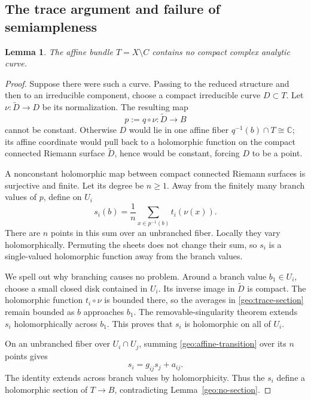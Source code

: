 \documentclass[11pt,a4paper]{article}
\numberwithin{equation}{section}
\newtheorem{lemma}[theorem]{Lemma}
\theoremstyle{definition}
\theoremstyle{remark}
\newcommand{\C}{\mathbb C}
\begin{document}
\subsection{The trace argument and failure of semiampleness}

\begin{lemma}\label{geo:no-compact-curves}
The affine bundle $T=X\setminus C$ contains no compact complex
analytic curve.
\end{lemma}

\begin{proof}
Suppose there were such a curve.  Passing to the reduced structure
and then to an irreducible component, choose a compact irreducible
curve $D\subset T$.  Let $\nu:\widetilde D\to D$ be its
normalization.  The resulting map
\[
  p:=q\circ\nu:\widetilde D\longrightarrow B
\]
cannot be constant.  Otherwise $D$ would lie in one affine fiber
$q^{-1}(b)\cap T\cong\C$; its affine coordinate would pull back to
a holomorphic function on the compact connected Riemann surface
$\widetilde D$, hence would be constant, forcing $D$ to be a point.

A nonconstant holomorphic map between compact connected Riemann
surfaces is surjective and finite.  Let its degree be $n\geq1$.
Away from the finitely many branch values of $p$, define on $U_i$
\begin{equation}\label{geo:trace-section}
  s_i(b)=\frac{1}{n}
          \sum_{x\in p^{-1}(b)}t_i(\nu(x)).
\end{equation}
There are $n$ points in this sum over an unbranched fiber.  Locally
they vary holomorphically.  Permuting the sheets does not change
their sum, so $s_i$ is a single-valued holomorphic function away
from the branch values.

We spell out why branching causes no problem.  Around a branch
value $b_1\in U_i$, choose a small closed disk contained in $U_i$.
Its inverse image in $\widetilde D$ is compact.  The holomorphic
function $t_i\circ\nu$ is bounded there, so the averages in
\eqref{geo:trace-section} remain bounded as $b$ approaches $b_1$.
The removable-singularity theorem extends $s_i$ holomorphically
across $b_1$.  This proves that $s_i$ is holomorphic on all of $U_i$.

On an unbranched fiber over $U_i\cap U_j$, summing
\eqref{geo:affine-transition} over its $n$ points gives
\[
  s_i=g_{ij}s_j+a_{ij}.
\]
The identity extends across branch values by holomorphicity.  Thus
the $s_i$ define a holomorphic section of $T\to B$, contradicting
Lemma~\ref{geo:no-section}.
\end{proof}
\end{document}
